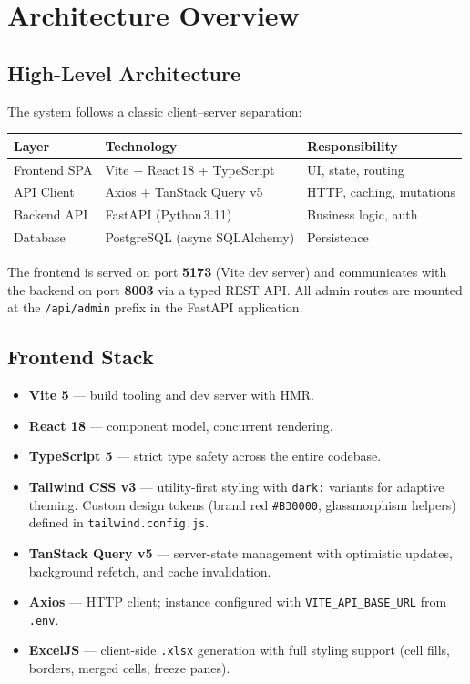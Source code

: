 \documentclass[12pt,a4paper]{report}
\begin{document}
\chapter{Architecture Overview}

\section{High-Level Architecture}

The system follows a classic client–server separation:

\begin{center}
\begin{tabular}{lll}
  \toprule
  \textbf{Layer} & \textbf{Technology} & \textbf{Responsibility} \\
  \midrule
  Frontend SPA & Vite + React\,18 + TypeScript & UI, state, routing \\
  API Client   & Axios + TanStack Query v5      & HTTP, caching, mutations \\
  Backend API  & FastAPI (Python\,3.11)          & Business logic, auth \\
  Database     & PostgreSQL (async SQLAlchemy)   & Persistence \\
  \bottomrule
\end{tabular}
\end{center}

The frontend is served on port \textbf{5173} (Vite dev server) and communicates
with the backend on port \textbf{8003} via a typed REST API. All admin routes are
mounted at the \texttt{/api/admin} prefix in the FastAPI application.

\section{Frontend Stack}

\begin{itemize}[leftmargin=2em]
  \item \textbf{Vite 5} — build tooling and dev server with HMR.
  \item \textbf{React 18} — component model, concurrent rendering.
  \item \textbf{TypeScript 5} — strict type safety across the entire codebase.
  \item \textbf{Tailwind CSS v3} — utility-first styling with \texttt{dark:}
        variants for adaptive theming. Custom design tokens (brand red
        \texttt{\#B30000}, glassmorphism helpers) defined in
        \texttt{tailwind.config.js}.
  \item \textbf{TanStack Query v5} — server-state management with
        optimistic updates, background refetch, and cache invalidation.
  \item \textbf{Axios} — HTTP client; instance configured with
        \texttt{VITE\_API\_BASE\_URL} from \texttt{.env}.
  \item \textbf{ExcelJS} — client-side \texttt{.xlsx} generation with full
        styling support (cell fills, borders, merged cells, freeze panes).
\end{itemize}
\end{document}
